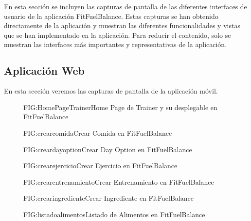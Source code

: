 En esta sección se incluyen las capturas de pantalla de las diferentes interfaces de usuario de la aplicación FitFuelBalance. Estas capturas se han obtenido directamente de la aplicación y muestran las diferentes funcionalidades y vistas que se han implementado en la aplicación. Para reducir el contenido, solo se muestran las interfaces más importantes y representativas de la aplicación.

\subsection{Aplicación Web}

En esta sección veremos las capturas de pantalla de la aplicación móvil.

\begin{figure}[Home Page Trainer]{FIG:HomePageTrainer}{Home Page de Trainer y su desplegable en FitFuelBalance}
\end{figure}

\begin{figure}[Crear Comida]{FIG:crearcomida}{Crear Comida en FitFuelBalance}
\end{figure}

\begin{figure}[Crear Day Option]{FIG:creardayoption}{Crear Day Option en FitFuelBalance}
\end{figure}

\begin{figure}[Crear Ejercicio]{FIG:crearejercicio}{Crear Ejercicio en FitFuelBalance}
\end{figure}

\begin{figure}[Crear Entrenamiento]{FIG:crearentrenamiento}{Crear Entrenamiento en FitFuelBalance}
\end{figure}

\begin{figure}[Crear Ingrediente]{FIG:crearingrediente}{Crear Ingrediente en FitFuelBalance}
\end{figure}

\begin{figure}[Listado de Alimentos]{FIG:listadoalimentos}{Listado de Alimentos en FitFuelBalance}
\end{figure}


